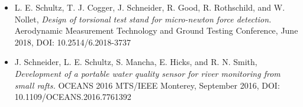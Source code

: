 \begin{itemize}
    \item L. E. Schultz, T. J. Cogger, J. Schneider, R. Good, R. Rothschild, and W. Nollet, \textit{Design of torsional test stand for micro-newton force detection.} Aerodynamic Measurement Technology and Ground Testing Conference, June 2018, DOI: 10.2514/6.2018-3737
    \item J. Schneider, L. E. Schultz, S. Mancha, E. Hicks, and R. N. Smith, \textit{Development of a portable water quality sensor for river monitoring from small rafts.} OCEANS 2016 MTS/IEEE Monterey, September 2016, DOI: 10.1109/OCEANS.2016.7761392
\end{itemize}
